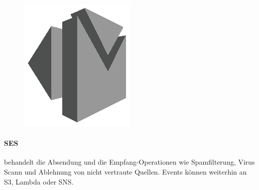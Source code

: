 \documentclass[
12pt,
english,
ngerman,
headsepline,
twoside,
openright,
numbers=noenddot,version=first
]{scrreprt}
\begin{document}
\begin{figure}
	\includegraphics[width=0.9\linewidth]{./pics/aws/Messaging_GRAYSCALE_AmazonSES.eps}
\end{figure}
\paragraph{\acrfull{SES}} behandelt die Absendung und die Empfang-Operationen wie Spamfilterung, Virus Scann und Ablehnung von nicht vertraute Quellen. Events können weiterhin an \acrshort{S3}, Lambda oder \acrshort{SNS}.


\end{document}
